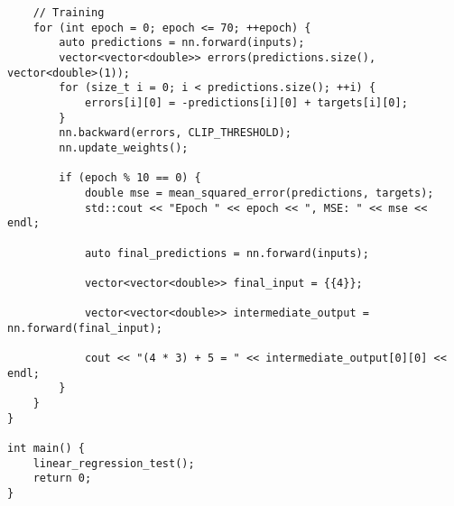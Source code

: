 \begin{verbatim}
    // Training
    for (int epoch = 0; epoch <= 70; ++epoch) {
        auto predictions = nn.forward(inputs);
        vector<vector<double>> errors(predictions.size(), vector<double>(1));
        for (size_t i = 0; i < predictions.size(); ++i) {
            errors[i][0] = -predictions[i][0] + targets[i][0];
        }
        nn.backward(errors, CLIP_THRESHOLD);
        nn.update_weights();

        if (epoch % 10 == 0) {
            double mse = mean_squared_error(predictions, targets);
            std::cout << "Epoch " << epoch << ", MSE: " << mse << endl;

            auto final_predictions = nn.forward(inputs);

            vector<vector<double>> final_input = {{4}};

            vector<vector<double>> intermediate_output = nn.forward(final_input);

            cout << "(4 * 3) + 5 = " << intermediate_output[0][0] << endl;
        }
    }
}

int main() {
    linear_regression_test();
    return 0;
}
\end{verbatim}
